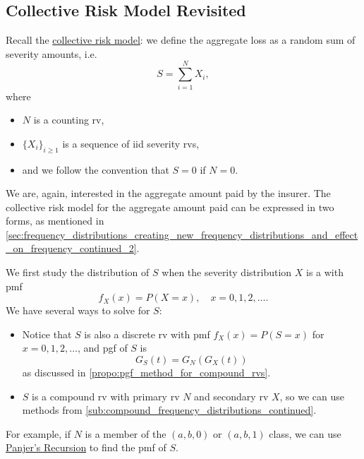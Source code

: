 \documentclass[notoc,notitlepage]{tufte-book}
\begin{document}

\subsection{Collective Risk Model Revisited}%
\label{sub:collective_risk_model_revisted}

Recall the \hyperref[defn:collective_risk_model]{collective risk model}: we define the aggregate loss as a random sum of severity amounts, i.e.
\begin{equation*}
  S = \sum_{i=1}^{N} X_i,
\end{equation*}
where
\begin{itemize}
  \item $N$ is a counting rv,
  \item $\{ X_i \}_{i \geq 1}$ is a sequence of iid severity rvs,
  \item and we follow the convention that $S = 0$ if $N = 0$.
\end{itemize}

We are, again, interested in the aggregate amount paid by the insurer. The collective risk model for the aggregate amount paid can be expressed in two forms, as mentioned in \cref{sec:frequency_distributions_creating_new_frequency_distributions_and_effect_on_frequency_continued_2}.

We first study the distribution of $S$ when the severity distribution $X$ is a  with pmf
\begin{equation*}
  f_X(x) = P(X = x), \quad x = 0, 1, 2, \ldots.
\end{equation*}
We have several ways to solve for $S$:
\begin{itemize}
  \item Notice that $S$ is also a discrete rv with pmf $f_X(x) = P(S = x)$ for $x = 0, 1, 2, \ldots$, and pgf of $S$ is
    \begin{equation*}
      G_S(t) = G_N( G_X(t) )
    \end{equation*}
    as discussed in \cref{propo:pgf_method_for_compound_rvs}.
  \item $S$ is a compound rv with primary rv $N$ and secondary rv $X$, so we can use methods from \cref{sub:compound_frequency_distributions_continued}.
\end{itemize}

For example, if $N$ is a member of the $(a, b, 0)$ or $(a, b, 1)$ class, we can use \hyperref[thm:panjer_s_recursion_for_a_b_0_class]{Panjer's Recursion} to find the pmf of $S$.
\end{document}
